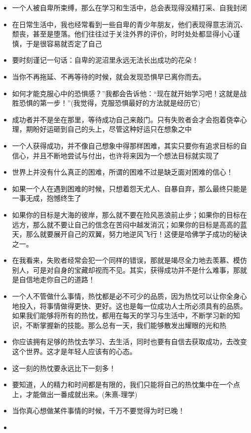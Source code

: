 \documentclass[UTF8,a4paper,8pt]{ctexbook}
\begin{document}
\begin{itemize}
			\item 一个人被自卑所束缚，那么在学习和生活中，总会表现得没精打采、自我封闭
			\item 在日常生活中，我也经常看到一些自卑的青少年朋友，他们表现得意志消沉、颓丧，甚至是堕落。他们往往过于关注外界的评价，时时处处都显得小心谨慎，于是很容易就否定了自己
			\item 要时刻谨记一句话：自卑的泥沼里永远无法长出成功的花朵！
			\item 当你不再拖延、不再等待的时候，就会发现恐惧早已离你而去。
			\item 如何才能克服心中的恐惧感？”我都会告诉他：“现在就开始学习吧！这就是战胜恐惧的第一步！”(我觉得，克服恐惧最好的方法就是经历它)
			\item 成功者并不是坐在那里，等待成功自己来敲门。只有失败者会才会抱着侥幸心理，期盼好运砸到自己的头上，尽管这种好运只在想象之中
			\item 一个人获得成功，并不像自己想象中得那样困难，其实只要你有追求目标的自信心，并且不断地尝试与付出，也许将来因为一个想法目标就实现了
			\item 世界上并没有什么真正的困难，所谓的困难不过是缺乏面对困难的信心！
			\item 如果一个人在遇到困难的时候，只想着怨天尤人、自暴自弃，那么最终只能是一事无成，抱憾终生了
			\item 如果你的目标是大海的彼岸，那么就不要在险风恶浪前止步；如果你的目标在远方，那么就不要让自己的信念在苦闷中越发消沉；如果你的目标是高高的蓝天，那么就要展开自己的双翼，努力地逆风飞行！这便是哈佛学子成功的秘诀之一。
			\item 在我看来，失败者经常会犯一个同样的错误，那就是竭尽全力地去羡慕、模仿别人，可是对自身的宝藏却视而不见。其实，获得成功并不是什么难事，那就是自信地走你自己的道路！
			\item 一个人不管做什么事情，热忱都是必不可少的品质，因为热忱可以让你全身心地投入，将事情做得更快、更好。这也是每一位成功人士所必须具有的品质。如果我们能够将所有的热忱，都用在每天的学习与生活中，不断学习新的知识，不断掌握新的技能。那么总有一天，我们能够散发出耀眼的光和热
			\item 你应该拥有足够的热忱去学习、去生活，同时也要有自信去获取成功，去改变这个世界。这才是年轻人应该有的心态。
			\item 这一刻的热忱要永远比下一刻多！
			\item 
			要知道，人的精力和时间都是有限的，我们只能将自己的热忱集中在一个点上，才能做出一番成就出来。(朱熹-理学)
			\item 当你真心想做某件事情的时候，千万不要觉得为时已晚！
			\item 

\end{itemize}
\end{document}
